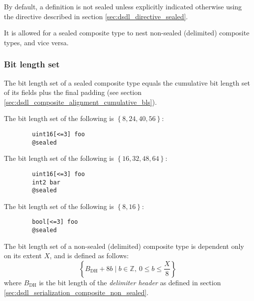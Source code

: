 By default, a definition is not sealed unless explicitly indicated otherwise using the directive described in
section \ref{sec:dsdl_directive_sealed}.

It is allowed for a sealed composite type to nest non-sealed (delimited) composite types, and vice versa.

\subsubsection{Bit length set}

The bit length set of a sealed composite type equals the cumulative bit length set
of its fields plus the final padding (see section \ref{sec:dsdl_composite_alignment_cumulative_bls}).

\begin{remark}
    The bit length set of the following is $\left\{ 8, 24, 40, 56 \right\}$:
    \begin{verbatim}
        uint16[<=3] foo
        @sealed
    \end{verbatim}

    The bit length set of the following is $\left\{ 16, 32, 48, 64 \right\}$:
    \begin{verbatim}
        uint16[<=3] foo
        int2 bar
        @sealed
    \end{verbatim}

    The bit length set of the following is $\left\{ 8, 16 \right\}$:
    \begin{verbatim}
        bool[<=3] foo
        @sealed
    \end{verbatim}
\end{remark}

The bit length set of a non-sealed (delimited) composite type is dependent only on its extent $X$,
and is defined as follows:
$$
    \left\{ B_\text{DH} + 8b \mid b \in \mathbb{Z},\ 0 \leq b \leq \frac{X}{8} \right\}
$$
where $B_\text{DH}$ is the bit length of the \emph{delimiter header}
as defined in section \ref{sec:dsdl_serialization_composite_non_sealed}.

